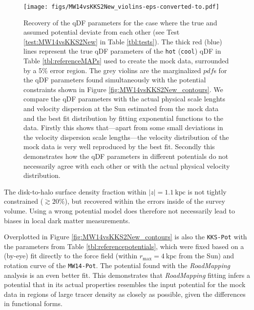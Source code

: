 \documentclass[iop,revtex4,numberedappendix,appendixfloats]{emulateapj}
\newcommand{\pdf}{\ensuremath{pdf}}
\newcommand{\RM}{{\sl RoadMapping}}
\begin{document}
\begin{figure*}[!htbp]
\texttt{[image: figs/MW14vsKKS2New\_violins-eps-converted-to.pdf]}
\caption{Recovery of the qDF parameters for the case where the true and assumed potential deviate from each other (see Test \ref{test:MW14vsKKS2New} in Table \ref{tbl:tests}). The thick red (blue) lines represent the true qDF parameters of the \texttt{hot} (\texttt{cool}) qDF in Table \ref{tbl:referenceMAPs} used to create the mock data, surrounded by a 5\% error region. The grey violins are the marginalized \pdf{}s for the qDF parameters found simultaneously with the potential constraints shown in Figure \ref{fig:MW14vsKKS2New_contours}. We compare the qDF parameters with the actual physical scale lenghts and velocity dispersion at the Sun estimated from the mock data and the best fit distribution by fitting exponential functions to the data. Firstly this shows that---apart from some small deviations in the velocity dispersion scale lengths---the velocity distribution of the mock data is very well reproduced by the best fit. Secondly this demonstrates how the qDF parameters in different potentials do not necessarily agree with each other or with the actual physical velocity distribution.}
\label{fig:MW14vsKKS2New_violins}
\end{figure*}

The disk-to-halo surface density fraction within $|z| = 1.1~\text{kpc}$ is not tightly constrained ($\gtrsim20\%$), but recovered within the errors inside of the survey volume. Using a wrong potential model does therefore not necessarily lead to biases in local dark matter measurements.

Overplotted in Figure \ref{fig:MW14vsKKS2New_contours} is also the \texttt{KKS-Pot} with the parameters from Table \ref{tbl:referencepotentials}, which were fixed based on a (by-eye) fit directly to the force field (within $r_\text{max}=4~\text{kpc}$ from the Sun) and rotation curve of the \texttt{MW14-Pot}. The potential found with the \RM{} analysis is an even better fit. This demonstrates that \RM{} fitting infers a potential that in its actual properties resembles the input potential for the mock data in regions of large tracer density as closely as possible, given the differences in functional forms.
\end{document}
